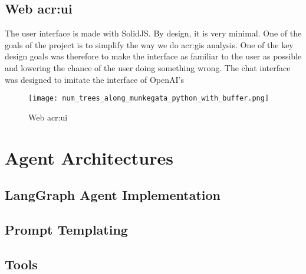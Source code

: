 \subsection[Web UI]{Web \acrshort{acr:ui}}

The user interface is made with SolidJS. By design, it is very minimal. One of the goals of the project is to simplify the way we do \acrshort{acr:gis} analysis. One of the key design goals was therefore to make the interface as familiar to the user as possible and lowering the chance of the user doing something wrong. The chat interface was designed to imitate the interface of OpenAI's

\begin{figure}[h]
    \centering
    \texttt{[image: num\_trees\_along\_munkegata\_python\_with\_buffer.png]}
    \caption{Web \acrshort{acr:ui}}
    \label{fig:web-ui}
\end{figure}


\glsresetall



\section{Agent Architectures}

\subsection{LangGraph Agent Implementation}

\subsection{Prompt Templating}

\subsection{Tools}


